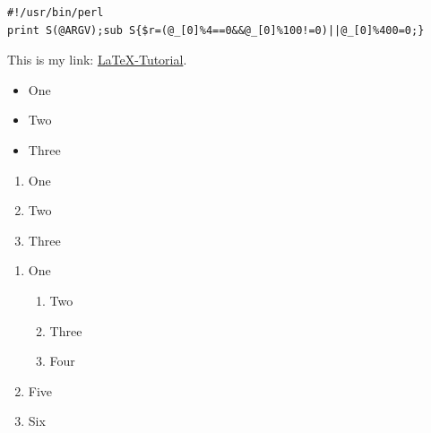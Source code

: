 \documentclass{article}
\begin{document}
\begin{lstlisting}
#!/usr/bin/perl
print S(@ARGV);sub S{$r=(@_[0]%4==0&&@_[0]%100!=0)||@_[0]%400=0;}
\end{lstlisting}

This is my link: \href{http://www.latex-tutorial.com}{LaTeX-Tutorial}.

\begin{itemize}
	\item One
	\item Two
	\item Three
\end{itemize}

\begin{enumerate}
	\item One
	\item Two
	\item Three
\end{enumerate}

\begin{enumerate}
	\item One
    \begin{enumerate}
    	\item Two
        \item Three
        \item Four
    \end{enumerate}
    \item Five
    \item Six
\end{enumerate}
\end{document}
